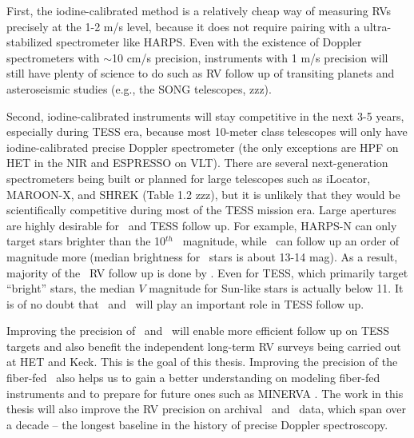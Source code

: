 First, the iodine-calibrated method is a relatively cheap way of
measuring RVs precisely at the 1-2 m/s level, because it does not
require pairing with a ultra-stabilized spectrometer like HARPS. Even
with the existence of Doppler spectrometers with $\sim$10 cm/s
precision, instruments with 1 m/s precision will still have plenty of
science to do such as RV follow up of transiting planets and
asteroseismic studies (e.g., the SONG telescopes, zzz). 

Second, iodine-calibrated instruments will stay competitive in the
next 3-5 years, especially during TESS era, because most 10-meter
class telescopes will only have iodine-calibrated precise Doppler
spectrometer (the only exceptions are HPF on HET in the NIR and
ESPRESSO on VLT). There are several next-generation spectrometers
being built or planned for large telescopes such as iLocator,
MAROON-X, and SHREK (Table 1.2 zzz), but it is unlikely that they
would be scientifically competitive during most of the TESS mission
era. Large apertures are highly desirable for \kepler\ and TESS follow
up. For example, HARPS-N can only target stars brighter than the
10$^{th}$ \kepler\ magnitude, while \keck\ can follow up an order of
magnitude more (median brightness for \kepler\ stars is about 13-14
mag). As a result, majority of the \kepler\ RV follow up is done by
\keck. Even for TESS, which primarily target ``bright'' stars, the
median $V$ magnitude for Sun-like stars is actually below 11. It is of
no doubt that \het\ and \keck\ will play an important role in TESS
follow up.

Improving the precision of \het\ and \keck\ will enable more efficient
follow up on TESS targets and also benefit the independent long-term
RV surveys being carried out at HET and Keck. This is the goal of this
thesis. Improving the precision of the fiber-fed \het\ also helps us
to gain a better understanding on modeling fiber-fed instruments and
to prepare for future ones such as MINERVA \citep{minerva}. The work
in this thesis will also improve the RV precision on archival \het\
and \keck\ data, which span over a decade -- the longest baseline in
the history of precise Doppler spectroscopy. 

